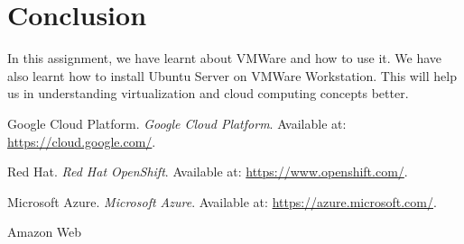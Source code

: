 \documentclass[11pt]{article}
\begin{document}
\section{Conclusion}
In this assignment, we have learnt about VMWare and how to use it. We have also learnt how to install Ubuntu Server on VMWare Workstation. This will help us in understanding virtualization and cloud computing concepts better.

\clearpage

\pagebreak
\begin{thebibliography}{}
    Google Cloud Platform. \textit{Google Cloud Platform}. Available at: \url{https://cloud.google.com/}.

    Red Hat. \textit{Red Hat OpenShift}. Available at: \url{https://www.openshift.com/}.

    Microsoft Azure. \textit{Microsoft Azure}. Available at: \url{https://azure.microsoft.com/}.

    Amazon Web
\end{thebibliography}
\end{document}
